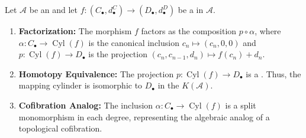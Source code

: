 \begin{proposition} \label{proposition:properties_of_mapping_cylinder_of_a_map_of_chain_complexes_in_an_additive_category}
Let $\mathcal{A}$ be an  and let $f: (C_\bullet, d^C_\bullet) \to (D_\bullet, d^D_\bullet)$ be a  in $\mathcal{A}$.

\begin{enumerate}
    \item \textbf{Factorization:} The morphism $f$ factors as the composition $p \circ \alpha$, where $\alpha: C_\bullet \to \operatorname{Cyl}(f)$ is the canonical inclusion $c_n \mapsto (c_n, 0, 0)$ and $p: \operatorname{Cyl}(f) \to D_\bullet$ is the projection $(c_n, c_{n-1}, d_n) \mapsto f(c_n) + d_n$.
    
    \item \textbf{Homotopy Equivalence:} The projection $p: \operatorname{Cyl}(f) \to D_\bullet$ is a . Thus, the mapping cylinder is isomorphic to $D_\bullet$ in the  $K(\mathcal{A})$.
    
    \item \textbf{Cofibration Analog:} The inclusion $\alpha: C_\bullet \to \operatorname{Cyl}(f)$ is a split monomorphism in each degree, representing the algebraic analog of a topological cofibration.
\end{enumerate}
\end{proposition}